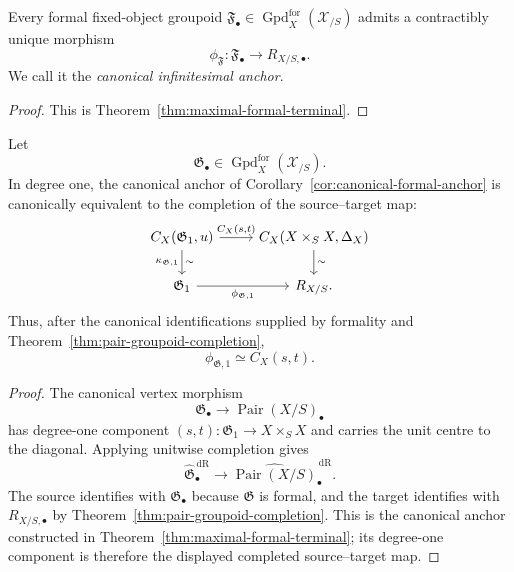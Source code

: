 \begin{corollary}
\label{cor:canonical-formal-anchor}
Every formal fixed-object groupoid
$\mathfrak F_\bullet\in
\operatorname{Gpd}^{\mathrm{for}}_X(\mathcal X_{/S})$
admits a contractibly unique morphism
\[
    \phi_{\mathfrak F}:
    \mathfrak F_\bullet
    \longrightarrow
    R_{X/S,\bullet}.
\]
We call it the \emph{canonical infinitesimal anchor}.
\end{corollary}

\begin{proof}
This is Theorem~\ref{thm:maximal-formal-terminal}.
\end{proof}

\begin{proposition}
\label{prop:canonical-anchor-completed-source-target}
Let
\[
    \mathfrak G_\bullet
    \in
    \operatorname{Gpd}^{\mathrm{for}}_X(\mathcal X_{/S}).
\]
In degree one, the canonical anchor of
Corollary~\ref{cor:canonical-formal-anchor} is canonically equivalent to the
completion of the source--target map:
\[
\begin{tikzcd}
C_X(\mathfrak G_1,u)
    \arrow[r,"{C_X(s,t)}"]
    \arrow[d,"{\kappa_{\mathfrak G,1}}"',"\sim"]
&
C_X(X\times_SX,\Delta_X)
    \arrow[d,"\sim"]
\\
\mathfrak G_1
    \arrow[r,"{\phi_{\mathfrak G,1}}"']
&
R_{X/S}.
\end{tikzcd}
\]
Thus, after the canonical identifications supplied by formality and
Theorem~\ref{thm:pair-groupoid-completion},
\[
    \phi_{\mathfrak G,1}
    \simeq
    C_X(s,t).
\]
\end{proposition}

\begin{proof}
The canonical vertex morphism
\[
    \mathfrak G_\bullet
    \longrightarrow
    \operatorname{Pair}(X/S)_\bullet
\]
has degree-one component $(s,t):\mathfrak G_1\to X\times_SX$ and carries the
unit centre to the diagonal.  Applying unitwise completion gives
\[
    \widehat{\mathfrak G}^{\,\mathrm{dR}}_\bullet
    \longrightarrow
    \widehat{\operatorname{Pair}(X/S)}^{\,\mathrm{dR}}_\bullet.
\]
The source identifies with $\mathfrak G_\bullet$ because $\mathfrak G$ is
formal, and the target identifies with $R_{X/S,\bullet}$ by
Theorem~\ref{thm:pair-groupoid-completion}.  This is the canonical anchor
constructed in Theorem~\ref{thm:maximal-formal-terminal}; its degree-one
component is therefore the displayed completed source--target map.
\end{proof}

